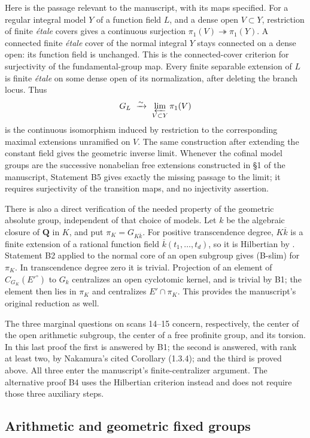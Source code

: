 \documentclass[11pt,a4paper]{article}
\begin{document}
Here is the passage relevant to the manuscript, with its maps specified.
For a regular integral model $Y$ of a function field $L$, and a dense open
$V\subset Y$, restriction of finite \emph{\'etale} covers gives a
continuous surjection $\pi_1(V)\twoheadrightarrow\pi_1(Y)$.
A connected finite \emph{\'etale} cover of the normal integral $Y$ stays
connected on a dense open: its function field is unchanged. This is the
connected-cover criterion for surjectivity of the fundamental-group map.
Every finite separable extension of $L$ is finite \emph{\'etale} on some
dense open of its normalization, after deleting the branch locus. Thus
\[
 G_L\ \xrightarrow{\sim}\ \varprojlim_{V\subset Y}\pi_1(V)
\]
is the continuous isomorphism induced by restriction to the corresponding
maximal extensions unramified on $V$. The same construction after extending
the constant field gives the geometric inverse limit. Whenever the cofinal
model groups are the successive nonabelian free extensions constructed in
\S1 of the manuscript, Statement B5 gives exactly the missing passage
to the limit; it requires surjectivity of the transition maps, and no
injectivity assertion.

There is also a direct verification of the needed property of the
geometric absolute group, independent of that choice of models. Let
$k$ be the algebraic closure of $\mathbf Q$ in $K$, and put
$\pi_K=G_{K\overline k}$. For positive transcendence degree,
$K\overline k$ is a finite extension of a rational function field
$\overline k(t_1,\ldots,t_d)$, so it is Hilbertian by
\cite[\S4, Theorem 2(a),(d)]{B_Geyer2012}. Statement B2 applied to the
normal core of an open subgroup gives (B-slim) for $\pi_K$. In
transcendence degree zero it is trivial. Projection of an element of
$C_{G_K}(E'^\circ)$ to $G_k$ centralizes an open cyclotomic kernel, and
is trivial by B1; the element then lies in $\pi_K$ and centralizes
$E'\cap\pi_K$. This provides the manuscript's original reduction as well.

The three marginal questions on scans 14--15 concern, respectively,
the center of the open arithmetic subgroup, the center of a free
profinite group, and its torsion. In this last proof the first is answered
by B1; the second is answered, with rank at least two, by Nakamura's cited
Corollary (1.3.4); and the third is proved above. All three enter the
manuscript's finite-centralizer argument. The alternative proof B4 uses
the Hilbertian criterion instead and does not require those three
auxiliary steps.

\subsection{Arithmetic and geometric fixed groups}
\end{document}
